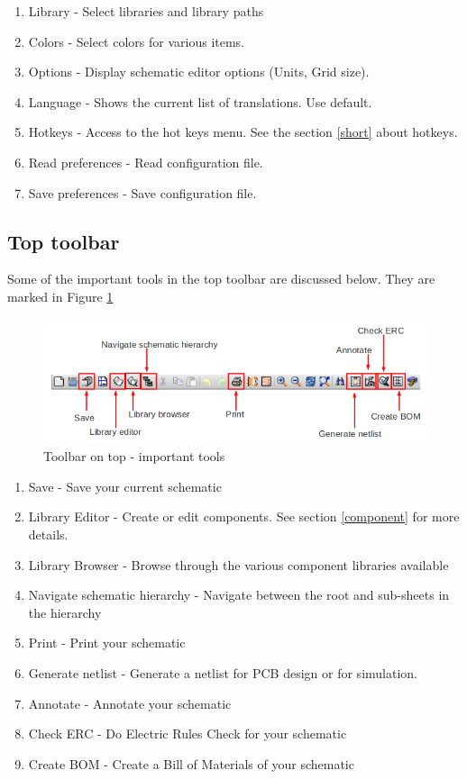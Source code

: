 \begin{enumerate}
\begin{enumerate}
\item Library - Select libraries and library paths
\item Colors - Select colors for various items.
\item Options - Display schematic editor options (Units, Grid size).
\item Language - Shows the current list of translations. Use default. 
\item Hotkeys - Access to the hot keys menu. See the section \ref{short} about hotkeys.
\item Read preferences - Read configuration file.
\item Save preferences - Save configuration file.
\end{enumerate}

\end{enumerate} 

\subsection{Top toolbar}
Some of the important tools in the top toolbar are discussed below. They are marked in Figure \ref{eeschem2}
\begin{figure}
\centering
\includegraphics[width=\textwidth]{figures/eeschema2_mod}
\caption{Toolbar on top - important tools}
\label{eeschem2}
\end{figure}
\begin{enumerate}
\item Save - Save your current schematic
\item Library Editor - Create or edit components. See section \ref{component} for more details.
\item Library Browser - Browse through the various component libraries available
\item Navigate schematic hierarchy - Navigate between the root and sub-sheets in the hierarchy
\item Print - Print your schematic
\item Generate netlist - Generate a netlist for PCB design or for simulation.
\item Annotate - Annotate your schematic
\item Check ERC - Do Electric Rules Check for your schematic
\item Create BOM - Create a Bill of Materials of your schematic
\end{enumerate}

